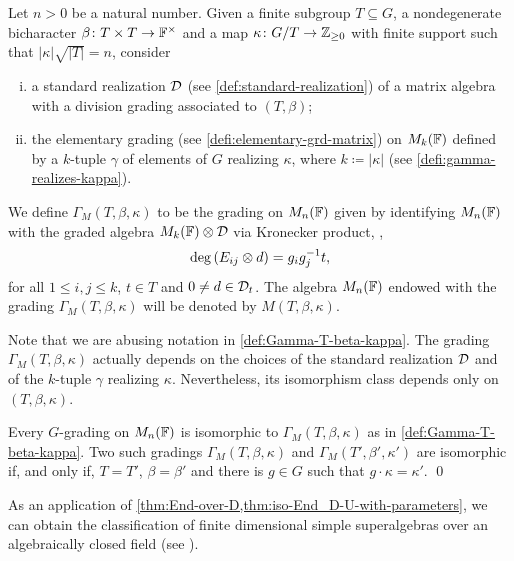 \begin{defi}\label{def:Gamma-T-beta-kappa}
    Let $n > 0$ be a natural number. 
    Given a finite subgroup $T \subseteq G$, a nondegenerate bicharacter $\beta\colon T\times T \to \mathbb{F}^\times$ and a map $\kappa\colon G/T \to \mathbb{Z}_{\geq 0}$ with finite support such that $|\kappa| \sqrt{|T|} = n$, consider
    \begin{enumerate}[(i)]
        \item a standard realization $\mathcal{D}$ (see \cref{def:standard-realization}) of a matrix algebra with a division grading associated to $(T,\beta)$;
        \item the elementary grading (see \cref{defi:elementary-grd-matrix}) on $M_{k}(\mathbb{F})$ defined by a $k$-tuple $\gamma$ of elements of $G$ realizing $\kappa$, where $k \coloneqq |\kappa|$ (see \cref{defi:gamma-realizes-kappa}).  
    \end{enumerate}
    We define $\Gamma_M (T, \beta, \kappa)$ to be the grading on $M_n(\mathbb{F})$ given by identifying $M_n(\mathbb{F})$ with the graded algebra $M_k(\mathbb{F}) \otimes \mathcal{D}$ via Kronecker product, \ie,
    \[
        \deg \left( E_{ij} \otimes d \right) = g_ig_j^{-1} t,
    \] 
    for all $1\leq i, j \leq k$, $t\in T$ and $0 \neq d \in \mathcal{D}_t$. 
    The algebra $M_n(\mathbb{F})$ endowed with the grading $\Gamma_M (T, \beta, \kappa)$ will be denoted by $M(T, \beta, \kappa)$.
\end{defi}

Note that we are abusing notation in \cref{def:Gamma-T-beta-kappa}. 
The grading $\Gamma_M (T, \beta, \kappa)$ actually depends on the choices of the standard realization $\mathcal{D}$ and of the $k$-tuple $\gamma$ realizing $\kappa$. 
Nevertheless, its isomorphism class depends only on $(T, \beta, \kappa)$. 

\begin{cor}\label{cor:grds-matrix-alg}
    Every $G$-grading on $M_n(\mathbb{F})$ is isomorphic to $\Gamma_M (T, \beta, \kappa)$ as in \cref{def:Gamma-T-beta-kappa}. 
    Two such gradings $\Gamma_M (T, \beta, \kappa)$ and $\Gamma_M (T', \beta', \kappa')$ are isomorphic if, and only if, $T = T'$, $\beta = \beta'$ and there is $g\in G$ such that  $g \cdot \kappa = \kappa'$. \qed
\end{cor}

As an application of \cref{thm:End-over-D,thm:iso-End_D-U-with-parameters}, we can obtain the classification of finite dimensional simple superalgebras over an algebraically closed field (see \cite{MR167498}). 

